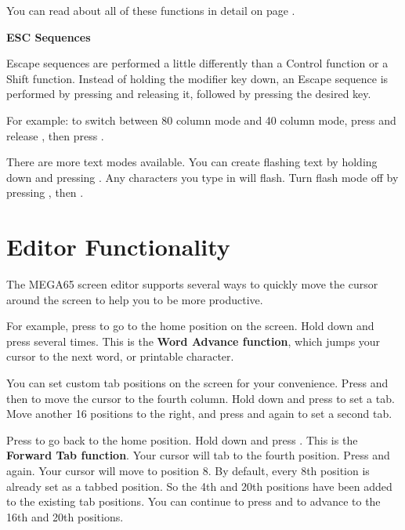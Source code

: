 You can read about all of these functions in detail on page \pageref{appendix:controlcodes}.

\needspace{2cm}
\textbf{ESC Sequences}

Escape sequences are performed a little differently than a Control function or a Shift function. Instead of holding the modifier key down, an Escape sequence is performed by pressing  and releasing it, followed by pressing the desired key.

For example: to switch between 80 column mode and 40 column mode, press and release , then press .

There are more text modes available. You can create flashing text by holding  down and pressing . Any characters you type in will flash. Turn flash mode off by pressing , then .


\section{Editor Functionality}

The MEGA65 screen editor supports several ways to quickly move the cursor around the screen to help you to be more productive.

For example, press  to go to the home position on the screen. Hold  down and press  several times. This is the \textbf{Word Advance function}, which jumps your cursor to the next word, or printable character.

You can set custom tab positions on the screen for your convenience. Press  and then \megakey{$\rightarrow$} to move the cursor to the fourth column. Hold down  and press  to set a tab. Move another 16 positions to the right, and press  and  again to set a second tab.

Press  to go back to the home position. Hold  down and press . This is the \textbf{Forward Tab function}. Your cursor will tab to the fourth position. Press  and  again. Your cursor will move to position 8. By default, every 8th position is already set as a tabbed position. So the 4th and 20th positions have been added to the existing tab positions. You can continue to press  and  to advance to the 16th and 20th positions.


